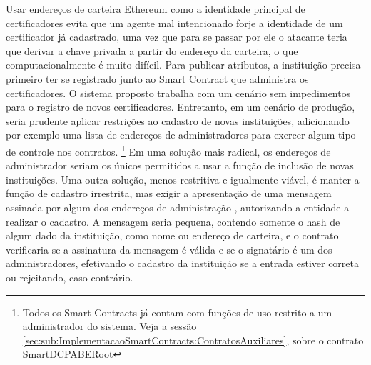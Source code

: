 \documentclass[a4paper,11pt]{article}
\begin{document}
Usar endereços de carteira Ethereum como a identidade principal de certificadores evita que um agente mal intencionado forje a identidade de um certificador já cadastrado, uma vez que para se passar por ele o atacante teria que derivar a chave privada a partir do endereço da carteira, o que computacionalmente é muito difícil.
Para publicar atributos, a instituição precisa primeiro ter se registrado junto ao Smart Contract que administra os certificadores.
O sistema proposto trabalha com um cenário sem impedimentos para o registro de novos certificadores.
Entretanto, em um cenário de produção, seria prudente aplicar restrições ao cadastro de novas instituições, adicionando por exemplo uma lista de endereços de administradores para exercer algum tipo de controle nos contratos.
\footnote{Todos os Smart Contracts já contam com funções de uso restrito a um administrador do sistema. Veja a sessão \ref{sec:sub:ImplementacaoSmartContracts:ContratosAuxiliares}, sobre o contrato SmartDCPABERoot}
Em uma solução mais radical, os endereços de administrador seriam os únicos permitidos a usar a função de inclusão de novas instituições.
Uma outra solução, menos restritiva e igualmente viável, é manter a função de cadastro irrestrita, mas exigir a apresentação de uma mensagem assinada por algum dos endereços de administração \cite{Marx2018}, autorizando a entidade a realizar o cadastro.
A mensagem seria pequena, contendo somente o hash de algum dado da instituição, como nome ou endereço de carteira, e o contrato verificaria se a assinatura da mensagem é válida e se o signatário é um dos administradores, efetivando o cadastro da instituição se a entrada estiver correta ou rejeitando, caso contrário.

\end{document}
